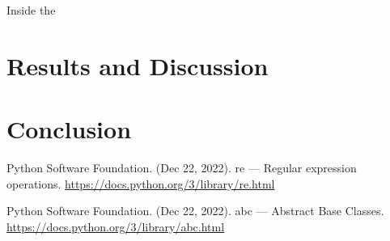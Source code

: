 \documentclass[...]{revdetua}
\begin{document}
Inside the 

\section{Results and Discussion}


\section{Conclusion}


\begin{thebibliography}{9}


% 

Python Software Foundation. (Dec 22, 2022). re — Regular expression operations. \url{https://docs.python.org/3/library/re.html}

Python Software Foundation. (Dec 22, 2022). abc — Abstract Base Classes. \url{https://docs.python.org/3/library/abc.html}

\end{thebibliography}


\end{document}

